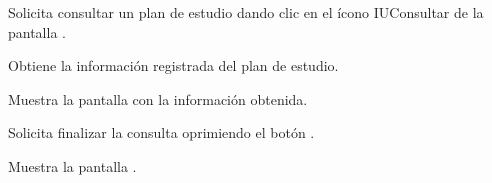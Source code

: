 \begin{UCtrayectoria}
	\UCpaso [\UCactor] Solicita consultar un plan de estudio dando clic en el ícono IUConsultar de la pantalla . 
	
	\UCpaso [\UCsist] Obtiene la información registrada del plan de estudio.
			
	\UCpaso [\UCsist] Muestra la pantalla  con la información obtenida.
	
	\UCpaso [\UCactor] Solicita finalizar la consulta oprimiendo el botón . 
	
	\UCpaso [\UCsist] Muestra la pantalla .
	
\end{UCtrayectoria}

